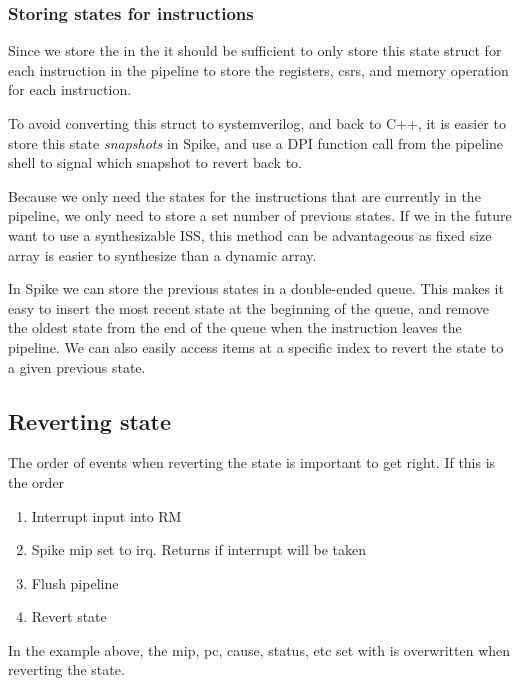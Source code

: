 \subsubsection{Storing states for instructions}

Since we store the  in the  it should be sufficient to only store this state struct for each instruction in the pipeline to store the registers, \acrshort{csr}s, and memory operation for each instruction. 

To avoid converting this struct to systemverilog, and back to C++, it is easier to store this state \textit{snapshots} in Spike, and use a DPI function call from the pipeline shell to signal which snapshot to revert back to.

Because we only need the states for the instructions that are currently in the pipeline, we only need to store a set number of previous states. If we in the future want to use a synthesizable ISS, this method can be advantageous as fixed size array is easier to synthesize than a dynamic array.

In Spike we can store the previous states in a  double-ended queue. This makes it easy to insert the most recent state at the beginning of the queue, and remove the oldest state from the end of the queue when the instruction leaves the pipeline. 
We can also easily access items at a specific index to revert the state to a given previous state.




\subsection{Reverting state}

The order of events when reverting the state is important to get right.
If this is the order

\begin{enumerate}
    \item Interrupt input into RM
    \item Spike mip set to irq. Returns if interrupt will be taken
    \item Flush pipeline
    \item Revert state
\end{enumerate}

In the example above, the mip, pc, cause, status, etc set with  is overwritten when reverting the state. 

